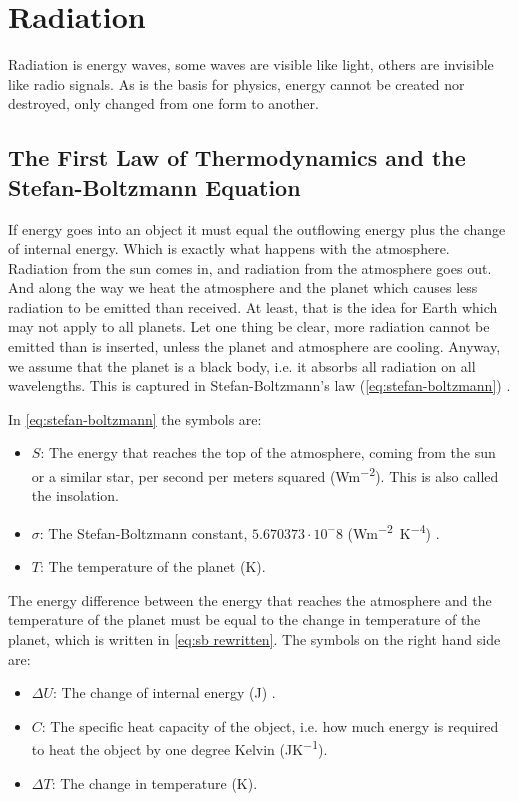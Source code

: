 \section{Radiation} \label{sec:rad}
Radiation is energy waves, some waves are visible like light, others are invisible like radio signals. As is the basis for physics, energy cannot be created nor destroyed, only changed from one
form to another.

\subsection{The First Law of Thermodynamics and the Stefan-Boltzmann Equation} \label{sec:first thermolaw}
If energy goes into an object it must equal the outflowing energy plus the change of internal energy. Which is exactly what happens with the atmosphere. Radiation from the sun comes in, and 
radiation from the atmosphere goes out. And along the way we heat the atmosphere and the planet which causes less radiation to be emitted than received. At least, that is the idea for Earth which
may not apply to all planets. Let one thing be clear, more radiation cannot be emitted than is inserted, unless the planet and atmosphere are cooling. Anyway, we assume that the planet is a black 
body, i.e. it absorbs all radiation on all wavelengths. This is captured in Stefan-Boltzmann's law (\autoref{eq:stefan-boltzmann}) \cite{stefan-boltzmann}. 

In \autoref{eq:stefan-boltzmann} the symbols are:

\begin{itemize}
    \item $S$: The energy that reaches the top of the atmosphere, coming from the sun or a similar star, per second per meters squared (\si{Wm^{-2}}). This is also called the insolation.
    \item $\sigma$: The Stefan-Boltzmann constant, $5.670373 \cdot 10^-8$ (\si{Wm^{-2}K^{-4}}) \cite{stefan-boltzmann}.
    \item $T$: The temperature of the planet (\si{K}).
\end{itemize}

The energy difference between the energy that reaches the atmosphere and the temperature of the planet must be equal to the change in temperature of the planet, which is written in 
\autoref{eq:sb rewritten}. The symbols on the right hand side are:

\begin{itemize}
    \item $\Delta U$: The change of internal energy (\si{J}) \cite{thermo1}.
    \item $C$: The specific heat capacity of the object, i.e. how much energy is required to heat the object by one degree Kelvin (\si{JK^{-1}}).
    \item $\Delta T$: The change in temperature (\si{K}).
\end{itemize}

